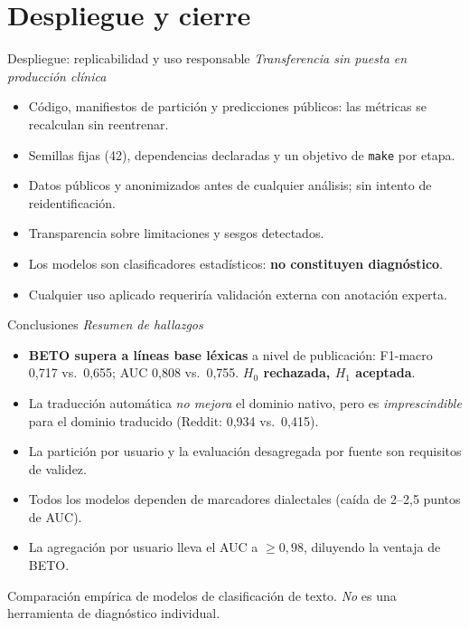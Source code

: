 ﻿\documentclass[11pt,aspectratio=169]{beamer}
\newcommand{\ugrsubtitle}[1]{%
  \vskip-0.25cm
  \small\textcolor{ugrGris}{\emph{#1}}\par
  \vskip0.15cm
}
\newcommand{\ugrblockok}[2]{
  \begin{tcolorbox}[
    enhanced, colback=ugrVerde!8, colframe=ugrVerde, boxrule=0.8pt, arc=3pt,
    title={\textbf{#1}}, fonttitle=\small\bfseries, coltitle=white, colbacktitle=ugrVerde,
    left=6pt, right=6pt, top=2pt, bottom=2pt, before skip=0.3em, after skip=0.2em
  ]
    #2
  \end{tcolorbox}
}
\begin{document}
\section{Despliegue y cierre}
\begin{frame}{Despliegue: replicabilidad y uso responsable}
  \ugrsubtitle{Transferencia sin puesta en producción clínica}
  \begin{itemize}
    \item Código, manifiestos de partición y predicciones públicos: las métricas se recalculan sin reentrenar.
    \item Semillas fijas (42), dependencias declaradas y un objetivo de \texttt{make} por etapa.
    \item Datos públicos y anonimizados antes de cualquier análisis; sin intento de reidentificación.
    \item Transparencia sobre limitaciones y sesgos detectados.
    \item Los modelos son clasificadores estadísticos: \textbf{no constituyen diagnóstico}.
    \item Cualquier uso aplicado requeriría validación externa con anotación experta.
  \end{itemize}
\end{frame}

\begin{frame}{Conclusiones}
  \ugrsubtitle{Resumen de hallazgos}
  {\small
    \begin{itemize}
      \item \textbf{BETO supera a líneas base léxicas} a nivel de publicación: F1-macro 0{,}717 vs.\ 0{,}655; AUC 0{,}808 vs.\ 0{,}755. \textbf{$H_0$ rechazada, $H_1$ aceptada}.
      \item La traducción automática \emph{no mejora} el dominio nativo, pero es \emph{imprescindible} para el dominio traducido (Reddit: 0{,}934 vs.\ 0{,}415).
      \item La partición por usuario y la evaluación desagregada por fuente son requisitos de validez.
      \item Todos los modelos dependen de marcadores dialectales (caída de 2--2{,}5 puntos de AUC).
      \item La agregación por usuario lleva el AUC a $\geq 0{,}98$, diluyendo la ventaja de BETO.
    \end{itemize}}
  \ugrblockok{Alcance}{
    Comparación empírica de modelos de clasificación de texto. \emph{No} es una herramienta de diagnóstico individual.
  }
\end{frame}
\end{document}
